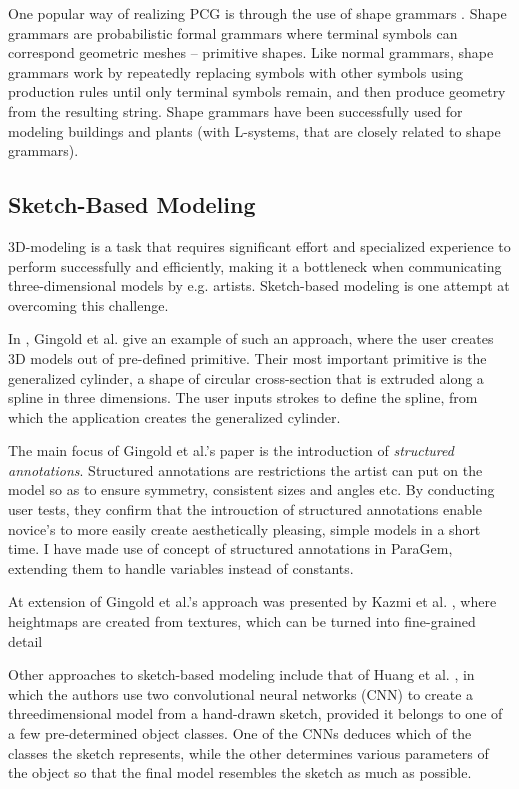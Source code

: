 \documentclass[english]{article}
\begin{document}
One popular way of realizing PCG is through the use of shape grammars \cite{stiny2006shape}. Shape grammars are probabilistic formal grammars where terminal symbols can correspond geometric meshes -- primitive shapes. Like normal grammars, shape grammars work by repeatedly replacing symbols with other symbols using production rules until only terminal symbols remain, and then produce geometry from the resulting string. Shape grammars have been successfully used for modeling buildings \cite{building_shape_grammar} and plants \cite{plant_l_system} (with L-systems, that are closely related to shape grammars).


\subsection{Sketch-Based Modeling} \label{subsection_review_sketch}

3D-modeling is a task that requires significant effort and specialized experience to perform successfully and efficiently, making it a bottleneck when communicating three-dimensional models by e.g. artists. Sketch-based modeling is one attempt at overcoming this challenge. 

In \cite{gingold09}, Gingold et al. give an example of such an approach, where the user creates 3D models out of pre-defined primitive. Their most important primitive is the generalized cylinder, a shape of circular cross-section that is extruded along a spline in three dimensions. The user inputs strokes to define the spline, from which the application creates the generalized cylinder.

The main focus of Gingold et al.'s paper is the introduction of \textit{structured annotations}. Structured annotations are restrictions the artist can put on the model so as to ensure symmetry, consistent sizes and angles etc. By conducting user tests, they confirm that the introuction of structured annotations enable novice's to more easily create aesthetically pleasing, simple models in a short time. I have made use of concept of structured annotations in ParaGem, extending them to handle variables instead of constants.

At extension of Gingold et al.'s approach was presented by Kazmi et al. \cite{hybrid_character_modeling}, where heightmaps are created from textures, which can be turned into fine-grained detail 

Other approaches to sketch-based modeling include that of Huang et al. \cite{procedural_sketch_cnn}, in which the authors use two convolutional neural networks (CNN) to create a threedimensional model from a hand-drawn sketch, provided it belongs to one of a few pre-determined object classes. One of the CNNs deduces which of the classes the sketch represents, while the other determines various parameters of the object so that the final model resembles the sketch as much as possible.
\end{document}

